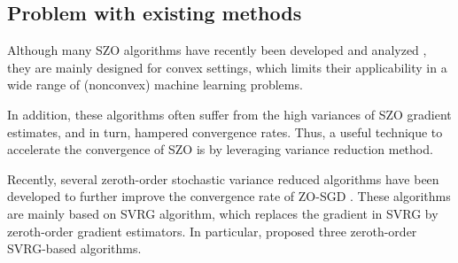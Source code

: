 \documentclass{article}
\theoremstyle{definition}
\theoremstyle{remark}
\begin{document}
\subsection{Problem with existing methods}
{\color{Brown}
Although many SZO algorithms have recently been developed and analyzed \cite{liu2017zeroth,flaxman2005online,shamir2013complexity,agarwal2010optimal,nesterov2017random,duchi2015optimal,shamir2017optimal,dvurechensky2018accelerated,wang2017stochastic}, they are mainly designed for convex settings, which limits their applicability in a wide range of (nonconvex) machine learning problems.

 In addition, these algorithms often suffer from the high variances of SZO gradient estimates, and in turn, hampered convergence rates. {\color{RubineRed}
Thus, a useful technique to accelerate the convergence of SZO is by leveraging variance reduction method.
}
}
{\color{YellowOrange}
Recently, several zeroth-order stochastic variance
reduced algorithms have been developed to further improve
the convergence rate of ZO-SGD \cite{liu2018stochastic,liu2018zeroth}. These algorithms are mainly based on SVRG algorithm, which replaces the gradient in
SVRG \cite{johnson2013accelerating} by zeroth-order gradient
estimators. In particular, \cite{liu2018zeroth} proposed three
zeroth-order SVRG-based algorithms. 

} 
\end{document}
